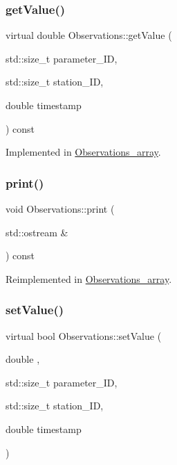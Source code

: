 \subsubsection{\texorpdfstring{get\+Value()}{getValue()}}
{\footnotesize\ttfamily virtual double Observations\+::get\+Value (\begin{DoxyParamCaption}\item[{std\+::size\+\_\+t}]{parameter\+\_\+\+ID,  }\item[{std\+::size\+\_\+t}]{station\+\_\+\+ID,  }\item[{double}]{timestamp }\end{DoxyParamCaption}) const\hspace{0.3cm}{\ttfamily [pure virtual]}}



Implemented in \mbox{\hyperlink{class_observations__array_a33f2154b3fed9d488e06e8c92eecc4db}{Observations\+\_\+array}}.

\mbox{\label{class_observations_a523647c5ae644959f0ed583cd7b11aba}} 
\subsubsection{\texorpdfstring{print()}{print()}}
{\footnotesize\ttfamily void Observations\+::print (\begin{DoxyParamCaption}\item[{std\+::ostream \&}]{ }\end{DoxyParamCaption}) const\hspace{0.3cm}{\ttfamily [virtual]}}



Reimplemented in \mbox{\hyperlink{class_observations__array_a2563545e5a38ec7e3ec09380c0b38855}{Observations\+\_\+array}}.

\mbox{\label{class_observations_a359b5b8cd97cd43483444ca4fc188dff}} 
\subsubsection{\texorpdfstring{set\+Value()}{setValue()}}
{\footnotesize\ttfamily virtual bool Observations\+::set\+Value (\begin{DoxyParamCaption}\item[{double}]{,  }\item[{std\+::size\+\_\+t}]{parameter\+\_\+\+ID,  }\item[{std\+::size\+\_\+t}]{station\+\_\+\+ID,  }\item[{double}]{timestamp }\end{DoxyParamCaption})\hspace{0.3cm}{\ttfamily [pure virtual]}}



